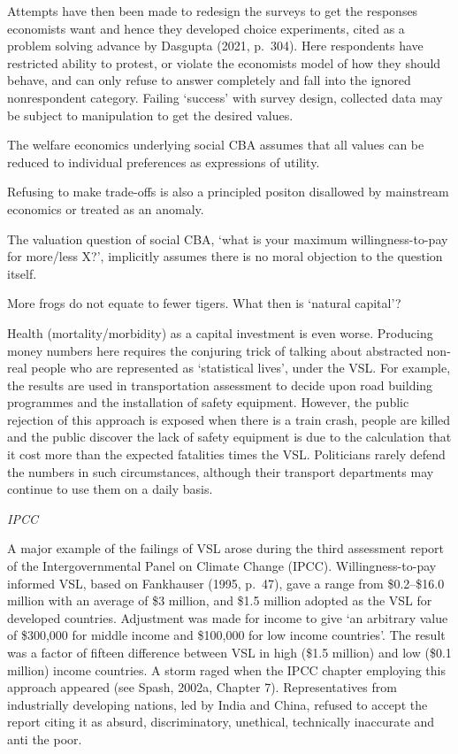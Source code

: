 \documentclass[
]{book}
\begin{document}
Attempts have then been made to redesign the surveys to get the responses economists want and
hence they developed choice experiments, cited as a problem solving advance by Dasgupta (2021,
p.~304). Here respondents have restricted ability to protest, or violate the economists model of
how they should behave, and can only refuse to answer completely and fall into the ignored
nonrespondent category. Failing `success' with survey design, collected data may be subject to
manipulation to get the desired values.

The welfare economics underlying social CBA assumes that all values can be reduced to individual
preferences as expressions of utility.

Refusing to make trade-offs is also a principled positon disallowed by
mainstream economics or treated as an anomaly.

The valuation question of social CBA, `what is your maximum willingness-to-pay for more/less
X?', implicitly assumes there is no moral objection to the question itself.

More frogs do not equate to fewer tigers.
What then is `natural capital'?

Health (mortality/morbidity) as a capital investment is even worse. Producing money numbers
here requires the conjuring trick of talking about abstracted non-real people who are represented as
`statistical lives', under the VSL. For example, the results are used in transportation assessment to
decide upon road building programmes and the installation of safety equipment. However, the
public rejection of this approach is exposed when there is a train crash, people are killed and the
public discover the lack of safety equipment is due to the calculation that it cost more than the
expected fatalities times the VSL. Politicians rarely defend the numbers in such circumstances,
although their transport departments may continue to use them on a daily basis.

\emph{IPCC}

A major example of the failings of VSL arose during the third assessment report of the
Intergovernmental Panel on Climate Change (IPCC). Willingness-to-pay informed VSL, based on
Fankhauser (1995, p.~47), gave a range from \$0.2--\$16.0 million with an average of \$3 million, and
\$1.5 million adopted as the VSL for developed countries. Adjustment was made for income to
give `an arbitrary value of \$300,000 for middle income and \$100,000 for low income countries'.
The result was a factor of fifteen difference between VSL in high (\$1.5 million) and low (\$0.1
million) income countries. A storm raged when the IPCC chapter employing this approach
appeared (see Spash, 2002a, Chapter 7). Representatives from industrially developing nations,
led by India and China, refused to accept the report citing it as absurd, discriminatory, unethical,
technically inaccurate and anti the poor.
\end{document}
